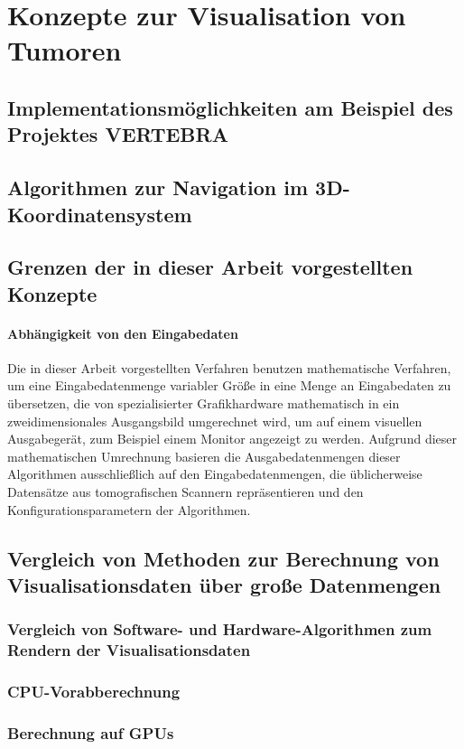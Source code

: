 \documentclass[a4paper]{scrartcl}
\begin{document}
\section{Konzepte zur Visualisation von Tumoren}\label{ssec:concepts}
\subsection{Implementationsmöglichkeiten am Beispiel des Projektes VERTEBRA}\label{ssec:implementations}
\subsection{Algorithmen zur Navigation im 3D-Koordinatensystem}\label{ssec:3dnav}
\subsection{Grenzen der in dieser Arbeit vorgestellten Konzepte}\label{ssec:limits}
\paragraph{Abhängigkeit von den Eingabedaten}
Die in dieser Arbeit vorgestellten Verfahren benutzen mathematische Verfahren, um eine Eingabedatenmenge variabler Größe
in eine Menge an Eingabedaten zu übersetzen, die von spezialisierter Grafikhardware mathematisch in ein zweidimensionales Ausgangsbild
umgerechnet wird, um auf einem visuellen Ausgabegerät, zum Beispiel einem Monitor angezeigt zu werden. Aufgrund dieser mathematischen
Umrechnung basieren die Ausgabedatenmengen dieser Algorithmen ausschließlich auf den Eingabedatenmengen, die üblicherweise Datensätze aus
tomografischen Scannern repräsentieren und den Konfigurationsparametern der Algorithmen.
\subsection{Vergleich von Methoden zur Berechnung von Visualisationsdaten über große Datenmengen}
\subsubsection{Vergleich von Software- und Hardware-Algorithmen zum Rendern der Visualisationsdaten}\label{ssec:swhwcomparison}
\subsubsection{CPU-Vorabberechnung}\label{sssec:cpucalculation}
\subsubsection{Berechnung auf GPUs}\label{sssec:gpucalculation}
\end{document}

